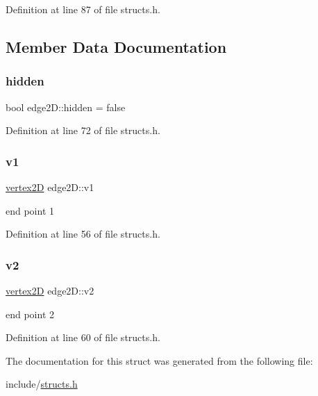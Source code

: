 Definition at line 87 of file structs.\+h.



\subsection{Member Data Documentation}
\mbox{\label{structedge2_d_a4c16cb9e65f46f54984e53d55ee789b2}} 
\subsubsection{\texorpdfstring{hidden}{hidden}}
{\footnotesize\ttfamily bool edge2\+D\+::hidden = false}



Definition at line 72 of file structs.\+h.

\mbox{\label{structedge2_d_ad1d0c2a78bb1b917fc205d94b532111a}} 
\subsubsection{\texorpdfstring{v1}{v1}}
{\footnotesize\ttfamily \mbox{\hyperlink{structvertex2_d}{vertex2D}} edge2\+D\+::v1}

end point 1 

Definition at line 56 of file structs.\+h.

\mbox{\label{structedge2_d_ade974e5430928f0a5946820852220717}} 
\subsubsection{\texorpdfstring{v2}{v2}}
{\footnotesize\ttfamily \mbox{\hyperlink{structvertex2_d}{vertex2D}} edge2\+D\+::v2}

end point 2 

Definition at line 60 of file structs.\+h.



The documentation for this struct was generated from the following file\+:\begin{DoxyCompactItemize}
\item 
include/\mbox{\hyperlink{structs_8h}{structs.\+h}}\end{DoxyCompactItemize}
